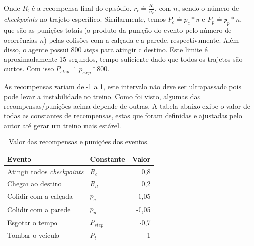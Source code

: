 Onde $R_t$ é a recompensa final do episódio. $r_c \doteq \frac{R_c}{n_c}$, com $n_c$ sendo o número de \textit{checkpoints} no trajeto específico. Similarmente, temos $P_c \doteq p_c * n$ e $P_p \doteq p_p * n$, que são as punições totais (o produto da punição do evento pelo número de ocorrências $n$) pelas colisões com a calçada e a parede, respectivamente. Além disso, o agente possui 800 \textit{steps} para atingir o destino. Este limite é aproximadamente 15 segundos, tempo suficiente dado que todos os trajetos são curtos. Com isso $P_{step} \doteq p_{step} * 800$.

As recompensas variam de -1 a 1, este intervalo não deve ser ultrapassado pois pode levar a instabilidade no treino. Como foi visto, algumas das recompensas/punições acima depende de outras. A tabela abaixo exibe o valor de todas as constantes de recompensas, estas que foram definidas e ajustadas pelo autor até gerar um treino mais estável. 

\begin{table}[htpb]
   \centering
   \caption{Valor das recompensas e punições dos eventos.}
   \label{tabela-recompensas}
   \begin{tabular}{|l|p{4cm}|r|}
        \hline
        \small{Evento}                           & \small{Constante}                              &   \small{Valor}     \\ \hline
         Atingir todos \textit{checkpoints}      & $R_c$                                          &    0,8              \\ \hline
         Chegar ao destino                       & $R_d$                                          &    0,2              \\ \hline
         Colidir com a calçada                   & $p_c$                                          &    -0,05            \\ \hline
         Colidir com a parede                    & $p_p$                                          &    -0,05            \\ \hline
         Esgotar o tempo                         & $P_{step}$                                     &    -0,7             \\ \hline
         Tombar o veículo                        & $P_t$                                          &    -1               \\ \hline
   \end{tabular}
\end{table}


